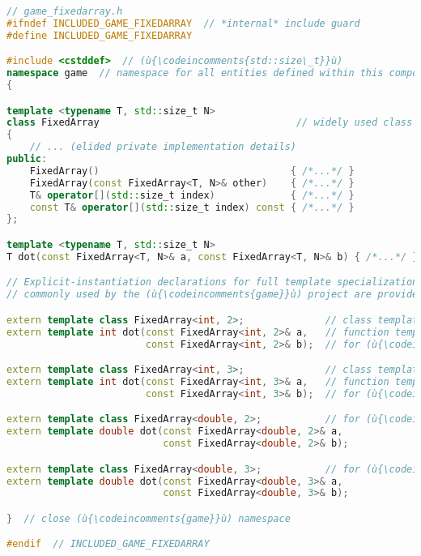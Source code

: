 \begin{lstlisting}[language=C++]
// game_fixedarray.h
#ifndef INCLUDED_GAME_FIXEDARRAY  // *internal* include guard
#define INCLUDED_GAME_FIXEDARRAY

#include <cstddef>  // (ù{\codeincomments{std::size\_t}}ù)
namespace game  // namespace for all entities defined within this component
{

template <typename T, std::size_t N>
class FixedArray                                  // widely used class template
{
    // ... (elided private implementation details)
public:
    FixedArray()                                 { /*...*/ }
    FixedArray(const FixedArray<T, N>& other)    { /*...*/ }
    T& operator[](std::size_t index)             { /*...*/ }
    const T& operator[](std::size_t index) const { /*...*/ }
};

template <typename T, std::size_t N>
T dot(const FixedArray<T, N>& a, const FixedArray<T, N>& b) { /*...*/ }

// Explicit-instantiation declarations for full template specializations
// commonly used by the (ù{\codeincomments{game}}ù) project are provided below.

extern template class FixedArray<int, 2>;              // class template
extern template int dot(const FixedArray<int, 2>& a,   // function template
                        const FixedArray<int, 2>& b);  // for (ù{\codeincomments{int}}ù) and (ù{\codeincomments{2}}ù)

extern template class FixedArray<int, 3>;              // class template
extern template int dot(const FixedArray<int, 3>& a,   // function template
                        const FixedArray<int, 3>& b);  // for (ù{\codeincomments{int}}ù) and (ù{\codeincomments{3}}ù)

extern template class FixedArray<double, 2>;           // for (ù{\codeincomments{double}}ù) and (ù{\codeincomments{2}}ù)
extern template double dot(const FixedArray<double, 2>& a,
                           const FixedArray<double, 2>& b);

extern template class FixedArray<double, 3>;           // for (ù{\codeincomments{double}}ù) and (ù{\codeincomments{3}}ù)
extern template double dot(const FixedArray<double, 3>& a,
                           const FixedArray<double, 3>& b);

}  // close (ù{\codeincomments{game}}ù) namespace

#endif  // INCLUDED_GAME_FIXEDARRAY
\end{lstlisting}
    
